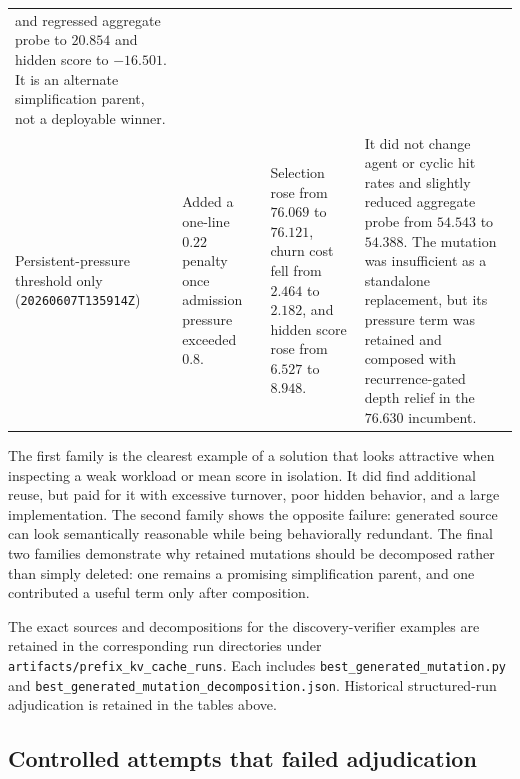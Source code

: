 \documentclass[11pt]{article}
\newcommand{\filepath}[1]{\nolinkurl{#1}}
\newcommand{\identifier}[1]{\nolinkurl{#1}}
\begin{document}
\begin{center}
\begin{tabularx}{\textwidth}{@{}>{\raggedright\arraybackslash}p{}
  >{\raggedright\arraybackslash}X
  >{\raggedright\arraybackslash}X
  >{\raggedright\arraybackslash}X@{}}
and regressed aggregate probe to \(20.854\) and hidden score to \(-16.501\).  It is an
alternate simplification parent, not a deployable winner. \\
\addlinespace
Persistent-pressure threshold only
(\identifier{20260607T135914Z}) &
Added a one-line \(0.22\) penalty once admission pressure exceeded \(0.8\). &
Selection rose from \(76.069\) to \(76.121\), churn cost fell from \(2.464\) to
\(2.182\), and hidden score rose from \(6.527\) to \(8.948\). &
It did not change agent or cyclic hit rates and slightly reduced aggregate probe from
\(54.543\) to \(54.388\).  The mutation was insufficient as a standalone replacement,
but its pressure term was retained and composed with recurrence-gated depth relief in
the \(76.630\) incumbent. \\
\bottomrule
\end{tabularx}
\end{center}

The first family is the clearest example of a solution that looks attractive when
inspecting a weak workload or mean score in isolation.  It did find additional reuse,
but paid for it with excessive turnover, poor hidden behavior, and a large
implementation.  The second family shows the opposite failure: generated source can
look semantically reasonable while being behaviorally redundant.  The final two
families demonstrate why retained mutations should be decomposed rather than simply
deleted: one remains a promising simplification parent, and one contributed a useful
term only after composition.

The exact sources and decompositions for the discovery-verifier examples are retained
in the corresponding run directories under
\filepath{artifacts/prefix_kv_cache_runs}.  Each includes
\filepath{best_generated_mutation.py} and
\filepath{best_generated_mutation_decomposition.json}.  Historical structured-run
adjudication is retained in the tables above.

\subsection{Controlled attempts that failed adjudication}
\end{document}
